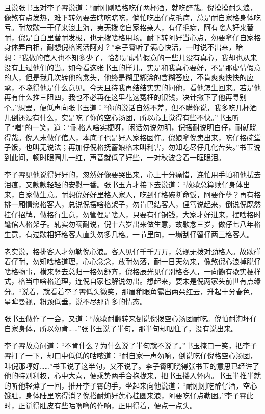 \documentclass[12pt,UTF8]{ctexbook}
\begin{document}
{{{且说张书玉对李子霄说道：“耐刚刚啥格吃仔两杯酒，就吃醉哉。倪摸摸耐头浪，像煞有点发热，难下转勿要去瞎吃瞎吃，倘忙吃出仔点毛病，总是耐自家格身体吃亏。耐故歇一干仔来浪上海，夷无拨啥自家格亲人，有仔毛病，阿有啥人好来替耐，倪是白白里替耐发极，也无拨啥格用场。耐下转阿好当心点，勿要拿仔自家格身体弄白相，耐想倪格闲活阿对？”李子霄听了满心快活，一时说不出来，暗想：“我做的倌人也不知多少了，恰都是虚情假意的一些儿没有真心，我却也从来没有上过他们的当。如今看这张书玉的样儿，实是和我真心要好，不是那虚情假意的人，但是我几次转他的念头，他终是糊里糊涂的含糊答应，不肯爽爽快快的应承，不晓得他是什么意见。今天且待我再结结实实的问他，看他怎生回来。若是他再有什么推三阻四，我也不必再在这里花这冤枉的银钱，决计撇下了他再寻别个。”想罢，便低声向张书玉道：“你的说话自然不差，但不瞒你说，我多吃几杯酒儿倒还没有什么，实是吃了你的空心汤团，所以心上觉得有些不快。”书玉听了“嗤”的一笑，道：“耐格人啥实梗呀，闲话勿说勿明，倪搭耐说明白仔，耐就晓得哉。倪人末做仔倌人，本底子也是好人家格囡仵。倪娘拿倪卖出来，吃仔格碗堂子饭，也叫无说法；再加仔倪格抚蓄娘格末叫利害，勿知吃尽仔几化苦头。”书玉说到此间，顿时眼圈儿一红，声音就低了好些，一对秋波含着一眶眼泪。

李子霄见他说得好好的，忽然好像要哭出来，心上十分痛惜，连忙用手帕和他拭去泪痕，又款款轻轻的安慰一番。张书玉方才接下去说道：“故歇总算赎仔身体出来，自家做生意。耐想倪好好里格人家人，吃到仔格碗断命饭，阿要作孽？再有格排一厢情愿格客人，总说倪摆啥格架子，勿肯巴结客人，俚笃说起来，倒说倪既然挂仔招牌，做格行生意，勿管俚是啥人，只要有仔铜钱，大家才好进来，摆啥格时髦倌人格架子。轧实勿瞒耐说，倪十六岁出来做生意，故歇念三岁，做仔七八年格生意，有过歇相好格客人直头勿多几格。一节里向，一塌刮仔留仔两三格客人。

老实说，格排客人才勿勒倪心浪。客人见仔千千万万，总规无拨对劲格人。故歇碰着仔耐，勿知啥格道理，心心念念，放耐勿落，耐一日天勿来，像煞倪心浪掉脱仔啥格物事，横来竖去总归一格勿舒齐，倪格辰光见仔别格客人，一向朆有歇实梗样式，格当中啥格道理，连倪自家也解说勿出。想起来，要末是倪两家头前世有点缘分。“说着，就看着李子霄低头微笑，那眉稍眼角露出两朵红云，升起十分春色，星眸曼视，粉颈低垂，说不尽那许多的情态。

张书玉做作了一会，又道：“故歇耐翻转来倒说倪拨空心汤团耐吃。倪怕耐淘坏仔自家身体，所以勿肯……”张书玉说了半句，那半句却咽住了，没有说出来。

李子霄故意问道：“不肯什么？为什么说了半句就不说了。”书玉掩口一笑，把李子霄打了一下，却口中低低的咕哝道：“耐自家一声勿响，倒说吃仔倪格空心汤团，叫倪那哼好……”书玉说了这半句，又不说了。李子霄明晓得张书玉的意思已经许了他的特别利权，心中大喜，便乘势两手合抱拢来，把书玉搂入怀内。书玉半推半就的听他轻薄了一回，推开李子霄的手，坐起来向他说道：“耐刚刚吃醉仔酒，空心饿肚，身体陆里吃得消？倪搭耐炖好莲心桂圆来浪，阿要吃仔点勒困。”李子霄此时，正觉得肚皮有些咕噜噜的作响，正用得着，便点一点头。

}}}
\end{document}

